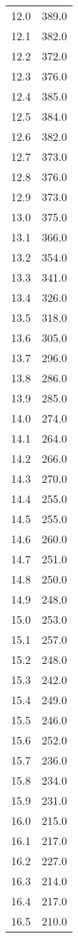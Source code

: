 \begin{table}
\begin{minipage}{0.5\textwidth}
\begin{tabular}{c c}
12.0&	389.0\\
12.1&	382.0\\
12.2&	372.0\\
12.3&	376.0\\
12.4&	385.0\\
12.5&	384.0\\
12.6&	382.0\\
12.7&	373.0\\
12.8&	376.0\\
12.9&	373.0\\
13.0&	375.0\\
13.1&	366.0\\
13.2&	354.0\\
13.3&	341.0\\
13.4&	326.0\\
13.5&	318.0\\
13.6&	305.0\\
13.7&	296.0\\
13.8&	286.0\\
13.9&	285.0\\
14.0&	274.0\\
14.1&	264.0\\
14.2&	266.0\\
14.3&	270.0\\
14.4&	255.0\\
14.5&	255.0\\
14.6&	260.0\\
14.7&	251.0\\
14.8&	250.0\\
14.9&	248.0\\
15.0&	253.0\\
15.1&	257.0\\
15.2&	248.0\\
15.3&	242.0\\
15.4&	249.0\\
15.5&	246.0\\
15.6&	252.0\\
15.7&	236.0\\
15.8&	234.0\\
15.9&	231.0\\
16.0&	215.0\\
16.1&	217.0\\
16.2&	227.0\\
16.3&	214.0\\
16.4&	217.0\\
16.5&	210.0\\
    \bottomrule
\end{tabular}
\end{minipage}

\end{table}

